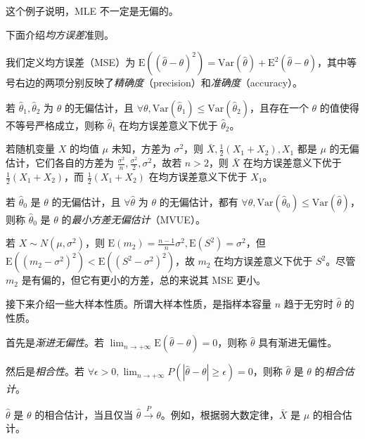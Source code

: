 \documentclass[../main.tex]{subfiles}
\begin{document}
这个例子说明，MLE 不一定是无偏的。

下面介绍\emph{均方误差}准则。

我们定义均方误差（MSE）为 $\mathrm E((\hat\theta-\theta)^2)=\mathrm{Var}(\hat\theta)+\mathrm E^2(\hat\theta-\theta)$，其中等号右边的两项分别反映了\emph{精确度}（precision）和\emph{准确度}（accuracy）。

\begin{definition}\label{def:6.3.2}
    若 $\hat\theta_1,\hat\theta_2$ 为 $\theta$ 的无偏估计，且 $\forall\theta,\mathrm{Var}(\hat\theta_1)\leq\mathrm{Var}(\hat\theta_2)$，且存在一个 $\theta$ 的值使得不等号严格成立，则称 $\hat\theta_1$ 在均方误差意义下优于 $\hat\theta_2$。
\end{definition}

\begin{example}
    若随机变量 $X$ 的均值 $\mu$ 未知，方差为 $\sigma^2$，则 $\bar X,\frac12(X_1+X_2),X_1$ 都是 $\mu$ 的无偏估计，它们各自的方差为 $\frac{\sigma^2}n,\frac{\sigma^2}2,\sigma^2$，故若 $n>2$，则 $\bar X$ 在均方误差意义下优于 $\frac12(X_1+X_2)$，而 $\frac12(X_1+X_2)$ 在均方误差意义下优于 $X_1$。
\end{example}

\begin{definition}\label{def:6.3.3}
    若 $\hat\theta_0$ 是 $\theta$ 的无偏估计，且 $\forall\hat\theta$ 为 $\theta$ 的无偏估计，都有 $\forall\theta,\mathrm{Var}(\hat\theta_0)\leq\mathrm{Var}(\hat\theta)$，则称 $\hat\theta_0$ 是 $\theta$ 的\emph{最小方差无偏估计}（MVUE）。
\end{definition}

\begin{example}
    若 $X\sim N(\mu,\sigma^2)$，则 $\mathrm E(m_2)=\frac{n-1}n\sigma^2,\mathrm E(S^2)=\sigma^2$，但 $\mathrm E((m_2-\sigma^2)^2)<\mathrm E((S^2-\sigma^2)^2)$，故 $m_2$ 在均方误差意义下优于 $S^2$。尽管 $m_2$ 是有偏的，但它有更小的方差，总的来说其 MSE 更小。
\end{example}

接下来介绍一些大样本性质。所谓大样本性质，是指样本容量 $n$ 趋于无穷时 $\hat\theta$ 的性质。

首先是\emph{渐进无偏性}。若 $\lim_{n\rightarrow+\infty}\mathrm E(\hat\theta-\theta)=0$，则称 $\hat\theta$ 具有渐进无偏性。

然后是\emph{相合性}。若 $\forall\epsilon>0,\lim_{n\rightarrow+\infty}P(|\hat\theta-\theta|\geq\epsilon)=0$，则称 $\hat\theta$ 是 $\theta$ 的\emph{相合估计}。

$\hat\theta$ 是 $\theta$ 的相合估计，当且仅当 $\hat\theta\overset{P}{\rightarrow}\theta$。例如，根据弱大数定律，$\bar X$ 是 $\mu$ 的相合估计。
\end{document}
